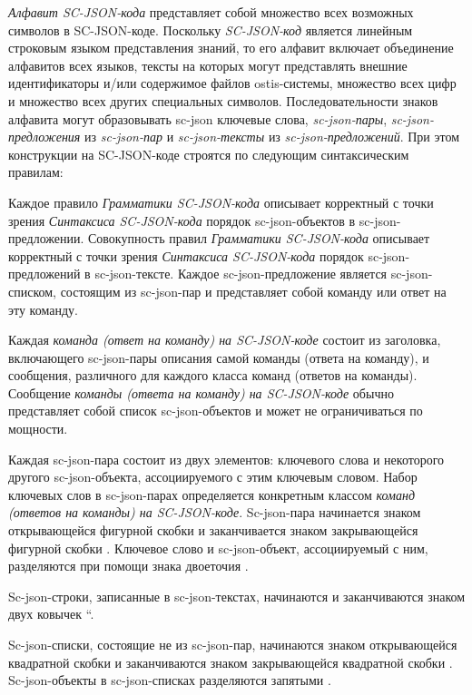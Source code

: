 \textit{Алфавит SC-JSON-кода\scnsupergroupsign} представляет собой множество всех возможных символов в SC-JSON-коде. Поскольку \textit{SC-JSON-код} является линейным строковым языком представления знаний, то его алфавит включает объединение алфавитов всех языков, тексты на которых могут представлять внешние идентификаторы и/или содержимое файлов ostis-системы, множество всех цифр и множество всех других специальных символов. Последовательности знаков алфавита могут образовывать sc-json ключевые слова, \textit{sc-json-пары}, \textit{sc-json-предложения} из \textit{sc-json-пар} и \textit{sc-json-тексты} из \textit{sc-json-предложений}. При этом конструкции на SC-JSON-коде строятся по следующим синтаксическим правилам:
\begin{textitemize}
    \item Каждое правило \textit{Грамматики SC-JSON-кода} описывает корректный с точки зрения \textit{Синтаксиса SC-JSON-кода} порядок sc-json-объектов в sc-json-предложении. Совокупность правил \textit{Грамматики SC-JSON-кода} описывает корректный с точки зрения \textit{Синтаксиса SC-JSON-кода} порядок sc-json-предложений в sc-json-тексте. Каждое sc-json-предложение является sc-json-списком, состоящим из sc-json-пар и представляет собой команду или ответ на эту команду.
    \item Каждая \textit{команда (ответ на команду) на SC-JSON-коде} состоит из заголовка, включающего sc-json-пары описания самой команды (ответа на команду), и сообщения, различного для каждого класса команд (ответов на команды). Сообщение \textit{команды (ответа на команду) на SC-JSON-коде} обычно представляет собой список sc-json-объектов и может не ограничиваться по мощности.
    \item Каждая sc-json-пара состоит из двух элементов: ключевого слова и некоторого другого sc-json-объекта, ассоциируемого с этим ключевым словом. Набор ключевых слов в sc-json-парах определяется конкретным классом \textit{команд (ответов на команды) на SC-JSON-коде}. Sc-json-пара начинается знаком открывающейся фигурной скобки \scnqq{\{} и заканчивается знаком закрывающейся фигурной скобки \scnqq{\}}. Ключевое слово и sc-json-объект, ассоциируемый с ним, разделяются при помощи знака двоеточия \scnqq{:}.
    \item Sc-json-строки, записанные в sc-json-текстах, начинаются и заканчиваются знаком двух ковычек \textquotedblleft.
    \item Sc-json-списки, состоящие не из sc-json-пар, начинаются знаком открывающейся квадратной скобки \scnqq{[} и заканчиваются знаком закрывающейся квадратной скобки \scnqq{]}. Sc-json-объекты в sc-json-списках разделяются запятыми \scnqq{,}.
\end{textitemize}

